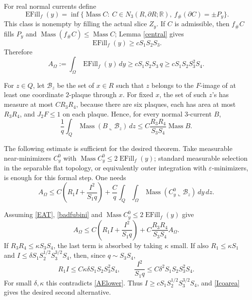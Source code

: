 \documentclass[12pt]{article}
\newcommand{\Mass}{\operatorname{Mass}}
\newcommand{\EFill}{\operatorname{EFill}}
\begin{document}
For real normal currents define
\[
\EFill_f(y)=\inf\{\Mass C:\ C\in N_3(R,\partial R;\mathbb R),\
        f_\#(\partial C)=\pm P_y\}.
\]
This class is nonempty by filling the actual slice \(Z_y\).  If \(C\) is
admissible, then \(f_\#C\) fills \(P_y\) and \(\Mass(f_\#C)\le\Mass C\);
Lemma \ref{central} gives
\begin{equation}\label{EFilllower}
        \EFill_f(y)\ge cS_1S_2S_3 .
\end{equation}
Therefore
\begin{equation}\label{AElower}
A_\Omega:=\int_\Omega\EFill_f(y)\,dy
        \ge cS_1S_2S_3\,q
        \ge cS_1S_2S_3^2S_4 .
\end{equation}

For \(z\in Q\), let \({\mathcal B}_z\) be the set of \(x\in R\) such that
\(z\) belongs to the \(F\)-image of at least one coordinate \(2\)-plaque
through \(x\).  For fixed \(x\), the set of such \(z\)'s has measure at most
\(CR_3R_4\), because there are six plaques, each has area at most \(R_3R_4\),
and \(J_2F\le1\) on each plaque.  Hence, for every normal \(3\)-current \(B\),
\begin{equation}\label{badfubini}
 \frac1q\int_Q\Mass(B\llcorner{\mathcal B}_z)\,dz
 \le C\frac{R_3R_4}{S_3S_4}\Mass B .
\end{equation}

The following estimate is sufficient for the desired theorem.  Take measurable
near-minimizers \(C_y^0\) with
\(\Mass C_y^0\le2\EFill_f(y)\); standard measurable selection in the
separable flat topology, or equivalently outer integration with
\(\varepsilon\)-minimizers, is enough for this formal step.  One needs
\begin{equation}\tag{EAT}\label{EAT}
 A_\Omega
 \le C\left(R_1I+\frac{I^2}{S_1q}\right)
 +\frac{C}{q}\int_Q\int_\Omega
       \Mass(C_y^0\llcorner{\mathcal B}_z)\,dy\,dz .
\end{equation}

Assuming \eqref{EAT}, \eqref{badfubini} and
\(\Mass C_y^0\le2\EFill_f(y)\) give
\[
A_\Omega\le C\left(R_1I+\frac{I^2}{S_1q}\right)
  +C\frac{R_3R_4}{S_3S_4}A_\Omega .
\]
If \(R_3R_4\le\kappa S_3S_4\), the last term is absorbed by taking
\(\kappa\) small.  If also \(R_1\le\kappa S_1\) and
\(I\le\delta S_1S_2^{1/2}S_3^{3/2}S_4\), then, since \(q\sim S_3S_4\),
\[
R_1I\le C\kappa\delta S_1S_2S_3^2S_4,\qquad
\frac{I^2}{S_1q}\le C\delta^2S_1S_2S_3^2S_4 .
\]
For small \(\delta,\kappa\) this contradicts \eqref{AElower}.  Thus
\(I\ge cS_1S_2^{1/2}S_3^{3/2}S_4\), and \eqref{Icoarea} gives the desired
second alternative.
\end{document}
